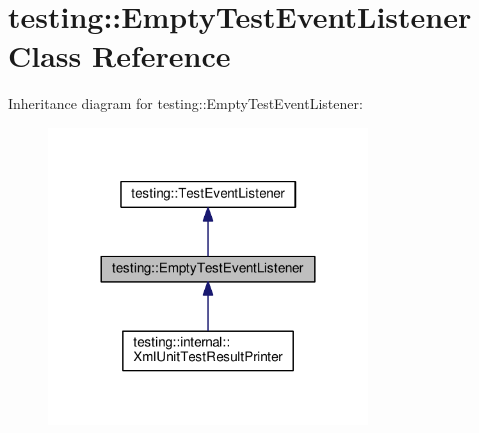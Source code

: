 \hypertarget{classtesting_1_1_empty_test_event_listener}{}\section{testing\+:\+:Empty\+Test\+Event\+Listener Class Reference}
\label{classtesting_1_1_empty_test_event_listener}


Inheritance diagram for testing\+:\+:Empty\+Test\+Event\+Listener\+:
\nopagebreak
\begin{figure}[H]
\begin{center}
\leavevmode
\includegraphics[width=240pt]{classtesting_1_1_empty_test_event_listener__inherit__graph}
\end{center}
\end{figure}
